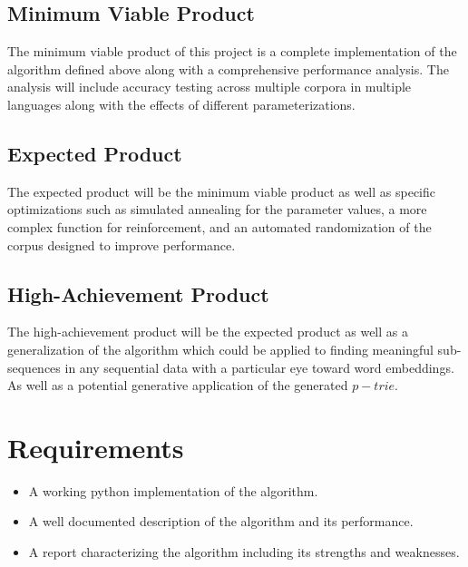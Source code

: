 \documentclass[11pt,a4paper]{article}
\begin{document}
\subsection{Minimum Viable Product}
The minimum viable product of this project is a complete implementation of the
algorithm defined above along with a comprehensive performance analysis. The 
analysis will include accuracy testing across multiple corpora in multiple
languages along with the effects of different parameterizations.
\subsection{Expected Product}
The expected product will be the minimum viable product as well as specific 
optimizations such as simulated annealing for the parameter values, a more
complex function for reinforcement, and an automated randomization of the 
corpus designed to improve performance.
\subsection{High-Achievement Product}
The high-achievement product will be the expected product as well as a generalization of the algorithm which could be applied to finding meaningful 
sub-sequences in any sequential data with a particular eye toward word 
embeddings. As well as a potential generative application of the generated 
$p-trie$.
\section{Requirements}
\begin{itemize}
        \item A working python implementation of the algorithm.
        \item A well documented description of the algorithm and its 
                performance.
        \item A report characterizing the algorithm including its strengths 
                and weaknesses.
\end{itemize}
\end{document}
